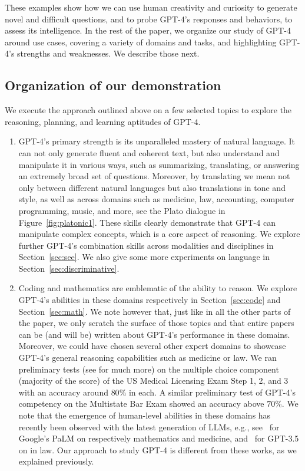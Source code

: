     These examples show how we can use human creativity and curiosity to generate novel and difficult questions, and to probe GPT-4's responses and behaviors, to assess its intelligence. In the rest of the paper, we organize our study of {GPT-4} around use cases, covering a variety of domains and tasks, and highlighting GPT-4's strengths and weaknesses. We describe those next.

    \subsection{Organization of our demonstration} \label{sec:outline}
    We execute the approach outlined above on a few selected topics to explore the reasoning, planning, and learning aptitudes of {GPT-4}.

\begin{enumerate}
    \item GPT-4's primary strength is its unparalleled mastery of natural language. It can not only generate fluent and coherent text, but also understand and manipulate it in various ways, such as summarizing, translating, or answering an extremely broad set of questions. Moreover, by translating we mean not only between different natural languages but also translations in tone and style, as well as across domains such as medicine, law, accounting, computer programming, music, and more, see the Plato dialogue in Figure~\ref{fig:platonic1}. These skills clearly demonstrate that {GPT-4} can manipulate complex concepts, which is a core aspect of reasoning. We explore further {GPT-4}'s combination skills across modalities and disciplines in Section~\ref{sec:see}. We also give some more experiments on language in Section~\ref{sec:discriminative}.
    \item Coding and mathematics are emblematic of the ability to reason. We explore {GPT-4}'s abilities in these domains respectively in Section~\ref{sec:code} and Section~\ref{sec:math}. We note however that, just like in all the other parts of the paper, we only scratch the surface of those topics and that entire papers can be (and will be) written about {GPT-4}'s performance in these domains. Moreover, we could have chosen several other expert domains to showcase {GPT-4}'s general reasoning capabilities such as medicine or law. We ran preliminary tests (see \cite{gpt4} for much more) on the multiple choice component (majority of the score) of the US Medical Licensing Exam Step 1, 2, and 3 with an accuracy around $80\%$ in each. A similar preliminary test of {GPT-4}'s competency on the Multistate Bar Exam showed an accuracy above $70\%$. We note that the emergence of human-level abilities in these domains has recently been observed with the latest generation of LLMs, e.g., see~\cite{lewkowycz2022solving, singhal2022large} for Google's PaLM on respectively mathematics and medicine, and~\cite{bommarito2022gpt} for GPT-3.5 on in law. Our approach to study {GPT-4} is different from these works, as we explained previously.

\end{enumerate}
